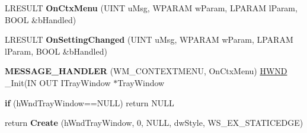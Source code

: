 \begin{DoxyCompactItemize}
\mbox{\label{class_c_tray_notify_wnd_a99c87fcea397deb6f1e944bc773d9392}} 
L\+R\+E\+S\+U\+LT {\bfseries On\+Ctx\+Menu} (U\+I\+NT u\+Msg, W\+P\+A\+R\+AM w\+Param, L\+P\+A\+R\+AM l\+Param, B\+O\+OL \&b\+Handled)
\item 
\mbox{\label{class_c_tray_notify_wnd_aeb69af92de0a81e954a6a6fd29d9fe11}} 
L\+R\+E\+S\+U\+LT {\bfseries On\+Setting\+Changed} (U\+I\+NT u\+Msg, W\+P\+A\+R\+AM w\+Param, L\+P\+A\+R\+AM l\+Param, B\+O\+OL \&b\+Handled)
\item 
\mbox{\label{class_c_tray_notify_wnd_a8d27e571424242b295511aeaa780e9ec}} 
{\bfseries M\+E\+S\+S\+A\+G\+E\+\_\+\+H\+A\+N\+D\+L\+ER} (W\+M\+\_\+\+C\+O\+N\+T\+E\+X\+T\+M\+E\+NU, On\+Ctx\+Menu) \hyperlink{interfacevoid}{H\+W\+ND} \+\_\+\+Init(IN O\+UT I\+Tray\+Window $\ast$Tray\+Window
\item 
\mbox{\label{class_c_tray_notify_wnd_aa746594225076689eebfee24c0e6193e}} 
{\bfseries if} (h\+Wnd\+Tray\+Window==N\+U\+LL) return N\+U\+LL
\item 
\mbox{\label{class_c_tray_notify_wnd_a84af4497a1886ab3d1a4741e9b32dfc2}} 
return {\bfseries Create} (h\+Wnd\+Tray\+Window, 0, N\+U\+LL, dw\+Style, W\+S\+\_\+\+E\+X\+\_\+\+S\+T\+A\+T\+I\+C\+E\+D\+GE)
\end{DoxyCompactItemize}

